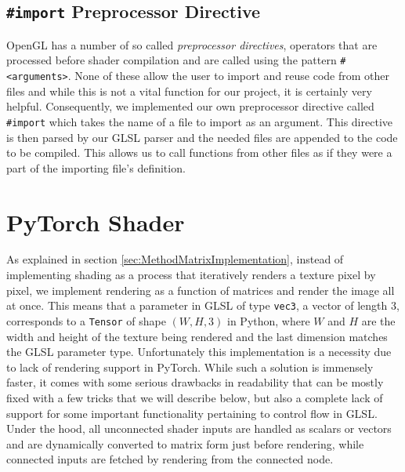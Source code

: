 

\subsection{\texttt{\#import} Preprocessor Directive}\label{sec:ImportPreprocessorDirective}

OpenGL has a number of so called \textit{preprocessor directives}, operators that are processed before shader compilation and are called using the pattern \texttt{\#<name-of-directive> <arguments>}. None of these allow the user to import and reuse code from other files and while this is not a vital function for our project, it is certainly very helpful. Consequently, we implemented our own preprocessor directive called \texttt{\#import} which takes the name of a file to import as an argument. This directive is then parsed by our GLSL parser and the needed files are appended to the code to be compiled. This allows us to call functions from other files as if they were a part of the importing file's definition. 

\section{PyTorch Shader}\label{sec:ImplementationPyTorchShader}

As explained in section \ref{sec:MethodMatrixImplementation}, instead of implementing shading as a process that iteratively renders a texture pixel by pixel, we implement rendering as a function of matrices and render the image all at once. This means that a parameter in GLSL of type \texttt{vec3}, a vector of length 3, corresponds to a \texttt{Tensor} of shape $(W,H,3)$ in Python, where $W$ and $H$ are the width and height of the texture being rendered and the last dimension matches the GLSL parameter type. Unfortunately this implementation is a necessity due to lack of rendering support in PyTorch. While such a solution is immensely faster, it comes with some serious drawbacks in readability that can be mostly fixed with a few tricks that we will describe below, but also a complete lack of support for some important functionality pertaining to control flow in GLSL. Under the hood, all unconnected shader inputs are handled as scalars or vectors and are dynamically converted to matrix form just before rendering, while connected inputs are fetched by rendering from the connected node. 

